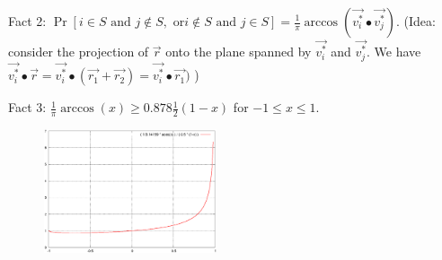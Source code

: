 \documentclass[mathserif]{beamer}
\begin{document}
{Fact 2: $\Pr[ i \in S \text{ and } j\notin S, \text{ or}   i \notin S \text{ and } j\in S ] = \tfrac{1}{\pi} \arccos( \vec{v_i^*} \bullet \vec{v_j^*} )$. 
(Idea: consider the projection of $\vec{r}$ onto the plane spanned by $\vec{v_i^*}$ and $\vec{v_j^*}$. We have $\vec{v_i^*} \bullet \vec{r} = \vec{v_i^*} \bullet ( \vec{r_1} + \vec{r_2} ) = \vec{v_i^*} \bullet  \vec{r_1} )$ )

Fact 3:  $ \tfrac{1}{\pi} \arccos(x) \geq 0.878 \tfrac{1}{2} (1-x)$ for $-1\leq x \leq 1$. 


\begin{figure}
    \includegraphics[width=2in]{L20-arccos.eps}
\end{figure}

} 

% 
%  
%  
% 
%  
%  
%  
% 
\end{document}
